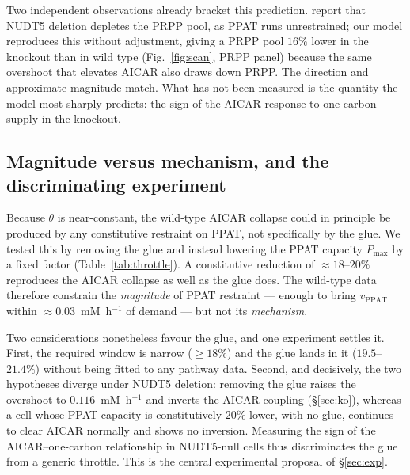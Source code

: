 \documentclass[a4paper,fleqn]{cas-sc}
\begin{document}
Two independent observations already bracket this prediction. \citet{strefeler2025}
report that NUDT5 deletion depletes the PRPP pool, as PPAT runs unrestrained; our
model reproduces this without adjustment, giving a PRPP pool $16\%$ lower in the
knockout than in wild type (Fig.~\ref{fig:scan}, PRPP panel) because the same
overshoot that elevates AICAR also draws down PRPP. The direction and approximate
magnitude match. What has not been measured is the quantity the model most
sharply predicts: the sign of the AICAR response to one-carbon supply in the
knockout.

\subsection{Magnitude versus mechanism, and the discriminating experiment}
\label{sec:disc}

Because $\theta$ is near-constant, the wild-type AICAR collapse could in
principle be produced by any constitutive restraint on PPAT, not specifically by
the glue. We tested this by removing the glue and instead lowering the PPAT
capacity $P_{\max}$ by a fixed factor (Table~\ref{tab:throttle}). A constitutive
reduction of $\approx18$--$20\%$ reproduces the AICAR collapse as well as the glue
does. The wild-type data therefore constrain the \emph{magnitude} of PPAT
restraint --- enough to bring $v_{\mathrm{PPAT}}$ within $\approx0.03$~mM~h$^{-1}$
of demand --- but not its \emph{mechanism}.

Two considerations nonetheless favour the glue, and one experiment settles it.
First, the required window is narrow ($\geq18\%$) and the glue lands in it
($19.5$--$21.4\%$) without being fitted to any pathway data. Second, and
decisively, the two hypotheses diverge under NUDT5 deletion: removing the glue
raises the overshoot to $0.116$~mM~h$^{-1}$ and inverts the AICAR coupling
(\S\ref{sec:ko}), whereas a cell whose PPAT capacity is constitutively $20\%$
lower, with no glue, continues to clear AICAR normally and shows no inversion.
Measuring the sign of the AICAR--one-carbon relationship in NUDT5-null cells thus
discriminates the glue from a generic throttle. This is the central experimental
proposal of \S\ref{sec:exp}.
\end{document}
